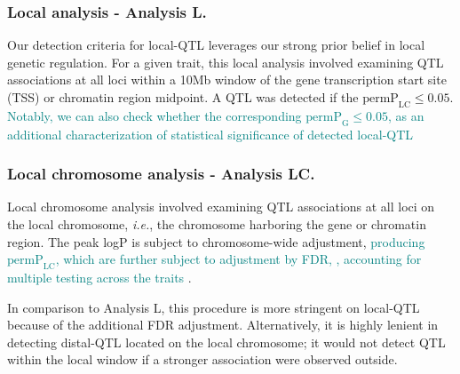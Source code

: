 \documentclass[9pt,twocolumn,twoside]{gsajnl}
\newcommand{\ie}{\emph{i.e.}\xspace}
\newcommand{\permplc}{\text{permP}_{\text{LC}}}
\newcommand{\WV}[2]{\textcolor{red}{#1\footnote{\textcolor{red}{WV: #2}}}}
\newcommand{\GKinline}[1]{\textcolor{teal}{#1}}
\begin{document}
\subsubsection{Local analysis - Analysis L.} 
Our detection criteria for local-QTL leverages our strong prior belief in local genetic regulation. For a given trait, this local analysis involved examining QTL associations at all loci within a 10Mb window of the gene transcription start site (TSS) or chromatin region midpoint. A QTL was detected if the $\text{permP}_{\text{LC}} \leq 0.05$. \GKinline{Notably, we can also check whether the corresponding $\text{permP}_{\text{G}} \leq 0.05$, as an additional characterization of statistical significance of detected local-QTL}


\subsubsection{Local chromosome analysis - Analysis LC.} 
Local chromosome analysis involved examining QTL associations at all loci on the local chromosome, \ie, the chromosome harboring the gene or chromatin region. The peak logP is subject to chromosome-wide adjustment, \GKinline{producing $\permplc$, which are further subject to adjustment by FDR, , accounting for multiple testing across the traits \citep{Chesler2005}}. 

In comparison to Analysis L, this procedure is more stringent on local-QTL because of the additional FDR adjustment. Alternatively, it is highly lenient in detecting distal-QTL located on the local chromosome; it would not detect QTL within the local window if a stronger association were observed outside.

\end{document}

